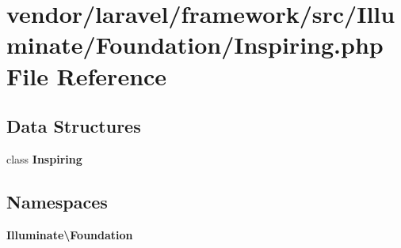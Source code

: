 \section{vendor/laravel/framework/src/\+Illuminate/\+Foundation/\+Inspiring.php File Reference}
\label{_inspiring_8php}
\subsection*{Data Structures}
\begin{DoxyCompactItemize}
\item 
class {\bf Inspiring}
\end{DoxyCompactItemize}
\subsection*{Namespaces}
\begin{DoxyCompactItemize}
\item 
 {\bf Illuminate\textbackslash{}\+Foundation}
\end{DoxyCompactItemize}
